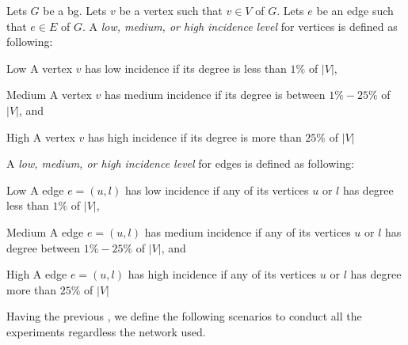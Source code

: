 \begin{definition}\label{def:exp:incidence}
Lets $G$ be a \acrlong{bg}.
Lets $v$ be a vertex such that $v \in V$ of $G$.
Lets $e$ be an edge such that $e \in E$ of $G$.
A \emph{low, medium, or high incidence level} for vertices is defined as following:
\begin{inparaenum}
  \item[Low] A vertex $v$ has low incidence if its degree is less than $1\%$ of $|V|$,
  \item[Medium] A vertex $v$ has medium incidence if its degree is between $1\%-25\%$ of $|V|$, and
  \item[High] A vertex $v$ has high incidence if its degree is more than $25\%$ of $|V|$
\end{inparaenum}
A \emph{low, medium, or high incidence level} for edges is defined as following:
\begin{inparaenum}
  \item[Low] A edge $e = (u, l)$ has low incidence if any of its vertices $u$ or $l$ has degree less than $1\%$ of $|V|$,
  \item[Medium] A edge $e = (u, l)$ has medium incidence if any of its vertices $u$ or $l$ has degree between $1\%-25\%$ of $|V|$, and
  \item[High] A edge $e = (u, l)$ has high incidence if any of its vertices $u$ or $l$ has degree more than $25\%$ of $|V|$
\end{inparaenum}
\end{definition}


Having the previous , we define the following scenarios to conduct all the experiments regardless the network used.

